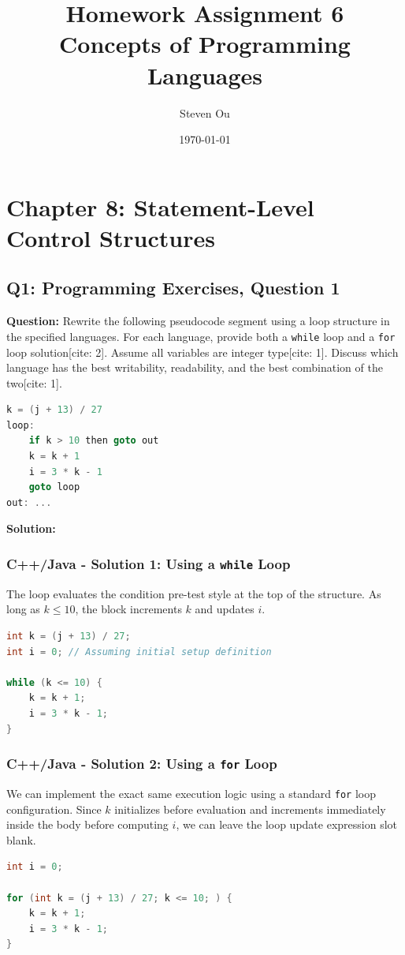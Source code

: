 \documentclass[11pt]{article}
\title{Homework Assignment 6 \\ \large Concepts of Programming Languages}
\author{Steven Ou}
\date{\today}
\begin{document}
\maketitle
\tableofcontents
\newpage

\section{Chapter 8: Statement-Level Control Structures}

\subsection{Q1: Programming Exercises, Question 1}
\textbf{Question:} Rewrite the following pseudocode segment using a loop structure in the specified languages. For each language, provide both a \texttt{while} loop and a \texttt{for} loop solution[cite: 2]. Assume all variables are integer type[cite: 1]. Discuss which language has the best writability, readability, and the best combination of the two[cite: 1].
\begin{lstlisting}[language=C]
    k = (j + 13) / 27
loop:
    if k > 10 then goto out
    k = k + 1
    i = 3 * k - 1
    goto loop
out: ...
\end{lstlisting}

\noindent\textbf{Solution:}

\subsubsection*{C++/Java - Solution 1: Using a \texttt{while} Loop}
The loop evaluates the condition pre-test style at the top of the structure. As long as $k \le 10$, the block increments $k$ and updates $i$.
\begin{lstlisting}[language=Java]
int k = (j + 13) / 27;
int i = 0; // Assuming initial setup definition

while (k <= 10) {
    k = k + 1;
    i = 3 * k - 1;
}
\end{lstlisting}

\subsubsection*{C++/Java - Solution 2: Using a \texttt{for} Loop}
We can implement the exact same execution logic using a standard \texttt{for} loop configuration. Since $k$ initializes before evaluation and increments immediately inside the body before computing $i$, we can leave the loop update expression slot blank.
\begin{lstlisting}[language=Java]
int i = 0;

for (int k = (j + 13) / 27; k <= 10; ) {
    k = k + 1;
    i = 3 * k - 1;
}
\end{lstlisting}
\end{document}
